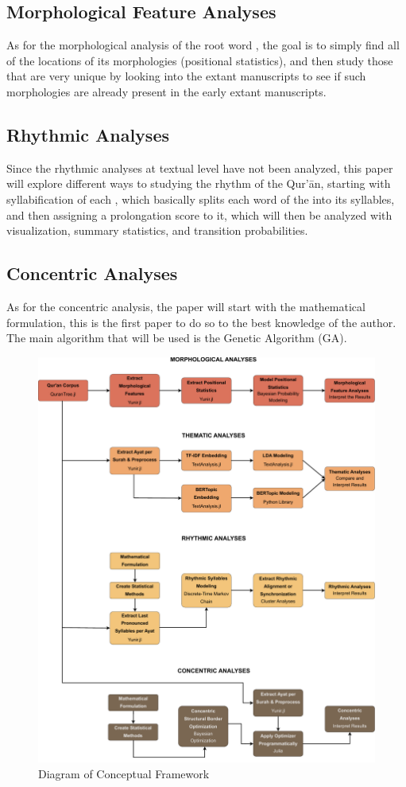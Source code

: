 \subsection{Morphological Feature Analyses}
As for the morphological analysis of the root word  , the goal is to simply find all of the locations of its morphologies (positional statistics), and then study those that are very unique by looking into the extant manuscripts to see if such morphologies are already present in the early extant manuscripts. 
\subsection{Rhythmic Analyses}
Since the rhythmic analyses at textual level have not been analyzed, this paper will explore different ways to studying the rhythm of the Qur'\=an, starting with syllabification of each  , which basically splits each word of the   into its syllables, and then assigning a prolongation score to it, which will then be analyzed with visualization, summary statistics, and transition probabilities.
\subsection{Concentric Analyses}
As for the concentric analysis, the paper will start with the mathematical formulation, this is the first paper to do so to the best knowledge of the author. The main algorithm that will be used is the Genetic Algorithm (GA).
\begin{figure}
    \label{fig:conceptual-framework}
    \includegraphics[width=\textwidth]{img/conceptual_framework.pdf}
    \vspace{2cm}
    \caption{Diagram of Conceptual Framework}
\end{figure}
